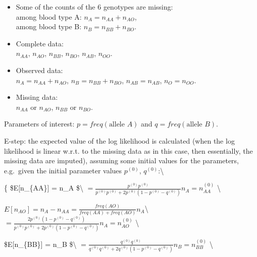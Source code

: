 \documentclass[]{article}
\begin{document}
\begin{itemize}

\item Some of the  counts of the 6 genotypes are missing:\\
among blood type A: $n_{A}=n_{AA}+n_{AO}$,\\
among blood type B: $n_{B}=n_{BB}+n_{BO}$.
\smallskip

\item Complete data:\\
$n_{AA}$, $n_{AO}$, $n_{BB}$, $n_{BO}$, $n_{AB}$, $n_{OO}$.
\smallskip

\item Observed data:\\
$n_A=n_{AA}+n_{AO}$, $n_B=n_{BB}+n_{BO}$,
$n_{AB}=n_{AB}$, $n_{O}=n_{OO}$.
\smallskip

\item Missing data:\\
$n_{AA}$ or $n_{AO}$, $n_{BB}$ or $n_{BO}$.
\end{itemize}

\bigskip

\item 

Parameters of interest: \(p=freq(\mbox{allele } A)\) and
\(q=freq(\mbox{allele } B)\). \pagebreak

\item 

E-step: the expected value of the log likelihood is calculated (when the
log likelihood is linear w.r.t. to the missing data as in this case,
then essentially, the missing data are imputed), assuming some initial
values for the parameters, e.g.~given the initial parameter values
\(p^{(0)}\), \(q^{(0)}\):\textbackslash{} \bigskip

\{\small
\$E{[}n\_\{AA\}{]} =  n\_A
\$\textbackslash{} \hspace*{1.8cm}
\(=\frac{p^{(0)}p^{(0)}}{p^{(0)}p^{(0)}+2p^{(0)}(1-p^{(0)}-q^{(0)})} n_A = n_{AA}^{(0)}\)
\textbackslash{} \bigskip

\(E[n_{AO}] = n_A-n_{AA} = \frac{freq(AO)}{freq(AA)+freq(AO)} n_A\)\textbackslash{}
\hspace*{1.8cm}
\(=\frac{2p^{(0)}(1-p^{(0)}-q^{(0)})}{p^{(0)}p^{(0)}+2p^{(0)}(1-p^{(0)}-q^{(0)})} n_A = n_{AO}^{(0)}\)
\textbackslash{} \bigskip
\bigskip

\$E{[}n\_\{BB\}{]} =  n\_B
\$\textbackslash{} \hspace*{1.8cm}
\(=\frac{q^{(0)}q^{(0)}}{q^{(0)}q^{(0)}+2q^{(0)}(1-p^{(0)}-q^{(0)})} n_B = n_{BB}^{(0)}\)
\textbackslash{} \bigskip
\end{document}
